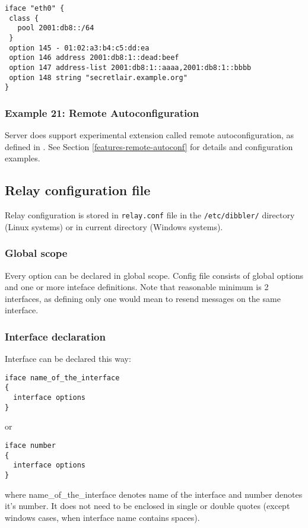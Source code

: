 \begin{lstlisting}
iface "eth0" {
 class {
   pool 2001:db8::/64
 }
 option 145 - 01:02:a3:b4:c5:dd:ea
 option 146 address 2001:db8:1::dead:beef
 option 147 address-list 2001:db8:1::aaaa,2001:db8:1::bbbb
 option 148 string "secretlair.example.org"
}
\end{lstlisting}


\subsubsection{Example 21: Remote Autoconfiguration}
Server does support experimental extension called remote
autoconfiguration, as defined in \cite{draft-remote-autoconf}. See
Section \ref{features-remote-autoconf} for details and configuration
examples.

\subsection{Relay configuration file}
\label{relay-conf}
Relay configuration is stored in \verb+relay.conf+ file in the
\verb+/etc/dibbler/+ directory (Linux systems) or in current directory
(Windows systems).

\subsubsection{Global scope}

Every option can be declared in global scope.
Config file consists of global options and one or more inteface
definitions. Note that reasonable minimum is 2 interfaces, as defining
only one would mean to resend messages on the same interface.

\subsubsection{Interface declaration}

Interface can be declared this way:
\begin{verbatim}
iface name_of_the_interface
{
  interface options
}
\end{verbatim}

or

\begin{verbatim}
iface number
{
  interface options
}
\end{verbatim}

where name\_of\_the\_interface denotes name of the interface and
number denotes it's number. It does not need to be enclosed in
single or double quotes (except windows cases, when interface name
contains spaces).

